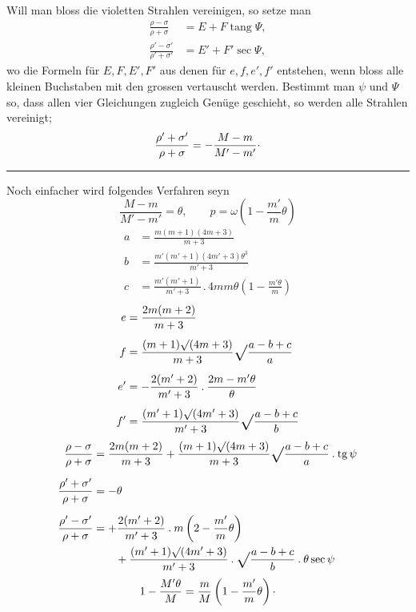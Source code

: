 Will man bloss die violetten Strahlen vereinigen, so setze man
\begin{align}
\frac{\rho-\sigma}{\rho+\sigma}&=E+F\operatorname{tang}\Psi,\tag*{[IIa]}\\[5pt]
\frac{\rho'-\sigma'}{\rho'+\sigma'}&=E'+F'\sec\Psi,\tag*{[IIb]}
\end{align}
\noindent wo die Formeln für $E,F,E',F'$ aus denen für $e,f,e',f'$ entstehen, wenn bloss alle kleinen Buchstaben mit den grossen vertauscht werden. Bestimmt man $\psi$ und $\Psi$ so, dass allen vier Gleichungen zugleich Genüge geschieht, so werden alle Strahlen vereinigt;
\[
\frac{\rho'+\sigma'}{\rho+\sigma}=-\frac{M-m}{M'-m'}\Vpoint
\]
\begin{center}\rule{.25\linewidth}{.4pt}\end{center}
\noindent\hspace*{\parindent}Noch einfacher wird folgendes Verfahren seyn
\[
\frac{M-m}{M'-m'}=\theta,\qquad p=\omega\left(1-\frac{m'}m\theta\right)
\]
\[
\begin{aligned}
a&=\frac{m(m+1)(4m+3)}{m+3}\\[5pt]
b&=\frac{m'(m'+1)(4m'+3)\theta^3}{m'+3}\\[5pt]
c&=\frac{m'(m'+1)}{m'+3}\mathbin{.}4mm\theta\left(1-\frac{m'\theta}m\right)
\end{aligned}
\]
\clearpage{}
\[
\begin{aligned}
e&=\frac{2m(m+2)}{m+3}\\[5pt]
f&=\frac{(m+1)\surd(4m+3)}{m+3}\Vroot\frac{a-b+c}{a}\\[5pt]
e'&=-\frac{2(m'+2)}{m'+3}\mathbin{.}\frac{2m-m'\theta}{\theta}\\[5pt]
f'&=\frac{(m'+1)\surd(4m'+3)}{m'+3}\Vroot\frac{a-b+c}{b}
\end{aligned}
\]
\[
\begin{aligned}
\frac{\rho-\sigma}{\rho+\sigma}&=\frac{2m(m+2)}{m+3}+\frac{(m+1)\surd(4m+3)}{m+3}\Vroot\frac{a-b+c}{a}\mathbin{.}\operatorname{tg}\psi\\[6pt]
\frac{\rho'+\sigma'}{\rho+\sigma}&=-\theta\\[6pt]
\frac{\rho'-\sigma'}{\rho+\sigma}&=+\frac{2(m'+2)}{m'+3}\mathbin{.}m\left(2-\frac{m'}m\theta\right)\\
&\qquad+\frac{(m'+1)\surd(4m'+3)}{m'+3}\mathbin{.}\Vroot\frac{a-b+c}{b}\mathbin{.}\theta\sec\psi
\end{aligned}
\]
\[
1-\frac{M'\theta}M=\frac mM\left(1-\frac{m'}m\theta\right)\Vpoint
\]

